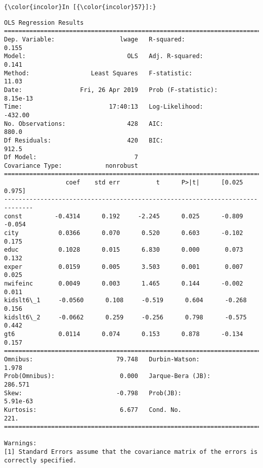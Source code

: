 \documentclass[11pt]{article}
\begin{document}
    \begin{Verbatim}[commandchars=\\\{\}]
{\color{incolor}In [{\color{incolor}57}]:} 
\end{Verbatim}


    \begin{Verbatim}[commandchars=\\\{\}]
                            OLS Regression Results                            
==============================================================================
Dep. Variable:                  lwage   R-squared:                       0.155
Model:                            OLS   Adj. R-squared:                  0.141
Method:                 Least Squares   F-statistic:                     11.03
Date:                Fri, 26 Apr 2019   Prob (F-statistic):           8.15e-13
Time:                        17:40:13   Log-Likelihood:                -432.00
No. Observations:                 428   AIC:                             880.0
Df Residuals:                     420   BIC:                             912.5
Df Model:                           7                                         
Covariance Type:            nonrobust                                         
==============================================================================
                 coef    std err          t      P>|t|      [0.025      0.975]
------------------------------------------------------------------------------
const         -0.4314      0.192     -2.245      0.025      -0.809      -0.054
city           0.0366      0.070      0.520      0.603      -0.102       0.175
educ           0.1028      0.015      6.830      0.000       0.073       0.132
exper          0.0159      0.005      3.503      0.001       0.007       0.025
nwifeinc       0.0049      0.003      1.465      0.144      -0.002       0.011
kidslt6\_1     -0.0560      0.108     -0.519      0.604      -0.268       0.156
kidslt6\_2     -0.0662      0.259     -0.256      0.798      -0.575       0.442
gt6            0.0114      0.074      0.153      0.878      -0.134       0.157
==============================================================================
Omnibus:                       79.748   Durbin-Watson:                   1.978
Prob(Omnibus):                  0.000   Jarque-Bera (JB):              286.571
Skew:                          -0.798   Prob(JB):                     5.91e-63
Kurtosis:                       6.677   Cond. No.                         221.
==============================================================================

Warnings:
[1] Standard Errors assume that the covariance matrix of the errors is correctly specified.

    \end{Verbatim}
\end{document}
